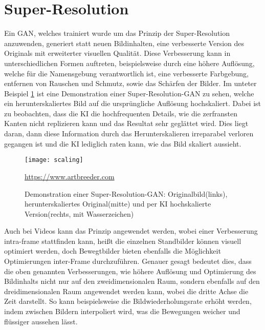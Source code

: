 \section{Super-Resolution}

\noindent Ein \ac{GAN}, welches trainiert wurde um das Prinzip der Super-Resolution anzuwenden, generiert statt neuen Bildinhalten, eine verbesserte Version des Originals mit erweiterter visuellen Qualität. Diese Verbesserung kann in unterschiedlichen Formen auftreten, beispielsweise durch eine höhere Auflösung, welche für die Namensgebung verantwortlich ist, eine verbesserte Farbgebung, entfernen von Rauschen und Schmutz, sowie das Schärfen der Bilder. Im unteter Beispiel \ref{fig:scaling} ist eine Demonstration einer Super-Resolution-GAN zu sehen, welche ein herunterskaliertes Bild auf die ursprüngliche Auflösung hochskaliert. Dabei ist zu beobachten, dass die KI die hochfrequenten Details, wie die zerfransten Kanten nicht replizieren kann und das Resultat sehr geglättet wird. Dies liegt daran, dann diese Information durch das Herunterskalieren irreparabel verloren gegangen ist und die KI lediglich raten kann, wie das Bild skaliert aussieht.\\


\begin{figure}[H]
    \centering
    \texttt{[image: scaling]}
    \caption{Demonstration einer Super-Resolution-GAN: Originalbild(links), herunterskaliertes Original(mitte) und per KI hochskalierte Version(rechts, mit Wasserzeichen)} \quelle\url{https://www.artbreeder.com}
\label{fig:scaling}
\end{figure}


\noindent Auch bei Videos kann das Prinzip angewendet werden, wobei einer Verbesserung intra-frame stattfinden kann, heißt die einzelnen Standbilder können visuell optimiert werden, doch Bewegtbilder bieten ebenfalls die Möglichkeit Optimierungen inter-Frame durchzuführen. Genauer gesagt bedeutet dies, dass die oben genannten Verbesserungen, wie höhere Auflösung und Optimierung des Bildinhalts nicht nur auf den zweidimensionalen Raum, sondern ebenfalls auf den dreidimensionalen Raum angewendet werden kann, wobei die dritte Achse die Zeit darstellt. So kann beispielsweise die Bildwiederholungsrate erhöht werden, indem zwischen Bildern interpoliert wird, was die Bewegungen weicher und flüssiger aussehen lässt.  \\